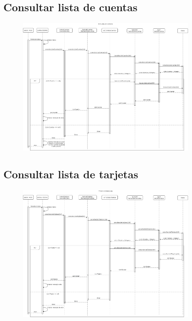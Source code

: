 \documentclass[12pt]{article}
\begin{document}
\subsection{Consultar lista de cuentas}
\begin{figure}[H]
    \centering
    \includegraphics[width=0.8\textwidth]{images/16-cuentaconsultartodos.png}
\end{figure}
\subsection{Consultar lista de tarjetas}
\begin{figure}[H]
    \centering
    \includegraphics[width=0.8\textwidth]{images/consultarListaTarjetas.png}
\end{figure}
\end{document}
